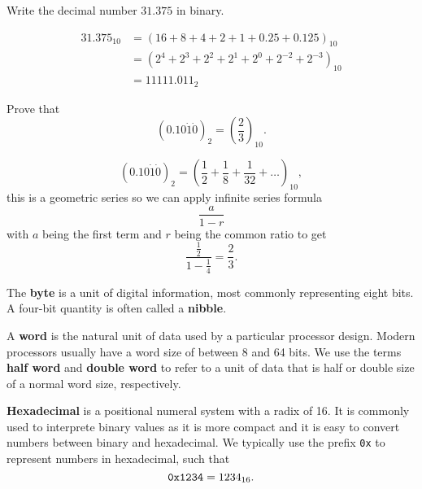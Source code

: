 \begin{example}
    Write the decimal number $31.375$ in binary.
\end{example}

\begin{solution}
    \begin{align*}
        31.375_{10} &= (16 + 8 + 4 + 2 + 1 + 0.25 + 0.125)_{10} \\
        &= (2^4 + 2^3 + 2^2 + 2^1 + 2^0 + 2^{-2} + 2^{-3})_{10} \\
        &= 11111.011_2
    \end{align*}
\end{solution}

\begin{example}
    Prove that \[ (0.10\dot{1}\dot{0})_2 = \left( \frac23 \right)_{10}.\]
\end{example}

\begin{solution}
        \[ (0.10\dot{1}\dot{0})_2 = \left( \frac12 + \frac18 + \frac1{32} + \ldots \right)_{10}, \] this is a geometric series so we can apply infinite series formula \[ \frac{a}{1 - r} \] with $a$ being the first term and $r$ being the common ratio to get \[ \frac{\frac12}{1 - \frac14} = \frac23. \]
\end{solution}
 
\begin{definition}
    The \textbf{byte} is a unit of digital information, most commonly representing eight bits. A four-bit quantity is often called a \textbf{nibble}.
\end{definition}

\begin{definition}[Word]
    A \textbf{word} is the natural unit of data used by a particular processor design. Modern processors usually have a word size of between 8 and 64 bits. We use the terms \textbf{half word} and \textbf{double word} to refer to a unit of data that is half or double size of a normal word size, respectively. 
\end{definition}

\begin{definition}[Hexadecimal]
    \textbf{Hexadecimal} is a positional numeral system with a radix of 16. It is commonly used to interprete binary values as it is more compact and it is easy to convert numbers between binary and hexadecimal. We typically use the prefix \texttt{0x} to represent numbers in hexadecimal, such that \[ \normalfont \texttt{0x1234} = 1234_{16}. \]
\end{definition}

